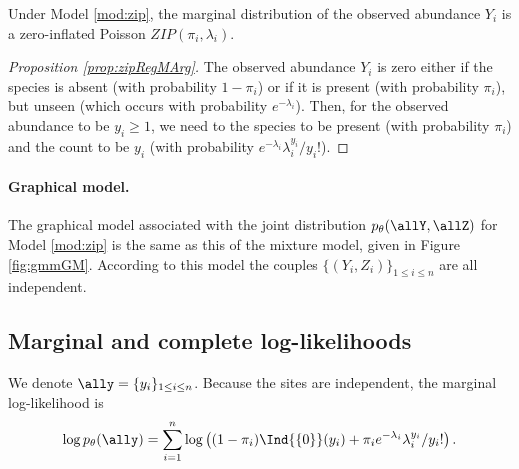  


\begin{proposition} \label{prop:zipRegMArg}
  Under Model \eqref{mod:zip}, the marginal distribution of the observed abundance $Y_i$ is a zero-inflated Poisson $ZIP(\pi_i, \lambda_i)$.
\end{proposition}

\begin{proof}[Proposition \ref{prop:zipRegMArg}]
The observed abundance $Y_i$ is zero either if the species is absent (with probability $1 - \pi_i$) or if it is present (with probability $\pi_i$), but unseen (which occurs with probability $e^{-\lambda_i}$). Then, for the observed abundance to be $y_i \geq 1$, we need to the species to be present (with probability $\pi_i$) and the count to be $y_i$ (with probability $e^{-\lambda_i} {\lambda_i^{y_i}}/{y_i!}$).
\end{proof}

\paragraph{Graphical model.}
The graphical model associated with the joint distribution $p_\theta(\allY, \allZ)$ for Model \eqref{mod:zip} is the same as this of the mixture model, given in Figure \ref{fig:gmmGM}. According to this model the couples $\{(Y_i, Z_i)\}_{1 \leq i \leq n}$ are all independent. 

%     

\subsection{Marginal and complete log-likelihoods}


We denote $\ally = \{y_i\}_{1 \leq i \leq n}$. Because the sites are independent, the marginal log-likelihood  is
$$
\log p_\theta(\ally) = \sum_{i=1}^n \log\left((1 - \pi_i) \Ind{\{0\}}(y_i) + \pi_i e^{-\lambda_i} {\lambda_i^{y_i}}/{y_i!}\right).
$$ 


